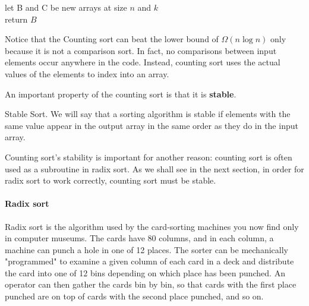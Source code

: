   \begin{algorithm}
  	let B and C be new arrays at size $n$ and $k$ \\ 
	  return $B$
\caption{Counting-sort$(A, n, k)$}
  \end{algorithm}

Notice that the Counting sort can beat the lower bound of $\Omega\left(n \log n\right)$ only because it is not a comparison sort. In fact, no comparisons between input elements occur anywhere in the code. Instead, counting sort uses the actual values of the elements to index into an array.

An important property of the counting sort is that it is \textbf{stable}.

\begin{defbox}{Stable Sort.}
 We will say that a sorting algorithm is stable if elements with the same value appear in the output array in the same order as they do in the input array. \end{defbox}

Counting sort's stability is important for another reason: counting sort is often used as a subroutine in radix sort. As we shall see in the next section, in order for radix sort to work correctly, counting sort must be stable.


\paragraph{Radix sort}
 Radix sort is the algorithm used by the card-sorting machines you now find only in computer museums. The cards have 80 columns, and in each column, a machine can punch a hole in one of 12 places. The sorter can be mechanically "programmed" to examine a given column of each card in a deck and distribute the card into one of 12 bins depending on which place has been punched. An operator can then gather the cards bin by bin, so that cards with the first place punched are on top of cards with the second place punched, and so on.

